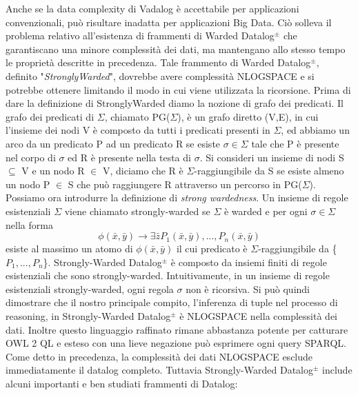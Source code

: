 Anche se la data complexity di Vadalog è accettabile per applicazioni convenzionali, può risultare inadatta per applicazioni Big Data. \newline
Ciò solleva il problema relativo all'esistenza di frammenti di Warded Datalog$^\pm$ che garantiscano una minore complessità dei dati, ma mantengano allo stesso tempo le proprietà descritte in precedenza. \newline
Tale frammento di Warded Datalog$^\pm$, definito "\emph{StronglyWarded}", dovrebbe avere complessità NLOGSPACE e si potrebbe ottenere limitando il modo in cui viene utilizzata la ricorsione. Prima di dare la definizione di StronglyWarded diamo la nozione di grafo dei predicati. \newline
Il grafo dei predicati di $\Sigma$, chiamato PG($\Sigma$), è un grafo diretto (V,E), in cui l'insieme dei nodi V è composto da tutti i predicati presenti in $\Sigma$, ed abbiamo un arco da un predicato P ad un predicato R se esiste $\sigma \in \Sigma$ tale che P è presente nel corpo di $\sigma$ ed R è presente nella testa di $\sigma$. Si consideri un insieme di nodi S $\subseteq$ V e un nodo R $\in$ V, diciamo che R è $\Sigma$-raggiungibile da S se esiste almeno un nodo P $\in$ S che può raggiungere R attraverso un percorso in PG($\Sigma$). \newline
Possiamo ora introdurre la definizione di \emph{strong wardedness}. Un insieme di regole esistenziali $\Sigma$ viene chiamato strongly-warded se $\Sigma$ è warded e per ogni $\sigma \in \Sigma$ nella forma \[\phi(\bar{x}, \bar{y}) \rightarrow \exists \bar{z} P_{1}(\bar{x}, \bar{y}), ..., P_{n}(\bar{x}, \bar{y})\] esiste al massimo un atomo di $\phi(\bar{x}, \bar{y})$ il cui predicato è $\Sigma$-raggiungibile da \{$P_{1}, ..., P_{n}$\}. \newline
Strongly-Warded Datalog$^\pm$ è composto da insiemi finiti di regole esistenziali che sono strongly-warded. \newline
Intuitivamente, in un insieme di regole esistenziali strongly-warded, ogni regola $\sigma$ non è ricorsiva. Si può quindi dimostrare che il nostro principale compito, l'inferenza di tuple nel processo di reasoning, in Strongly-Warded Datalog$^\pm$ è NLOGSPACE nella complessità dei dati. Inoltre questo linguaggio raffinato rimane abbastanza potente per catturare OWL 2 QL e esteso con una lieve negazione può esprimere ogni query SPARQL. \newline
Come detto in precedenza, la complessità dei dati NLOGSPACE esclude immediatamente il datalog completo. Tuttavia Strongly-Warded Datalog$^\pm$ include alcuni importanti e ben studiati frammenti di Datalog:
